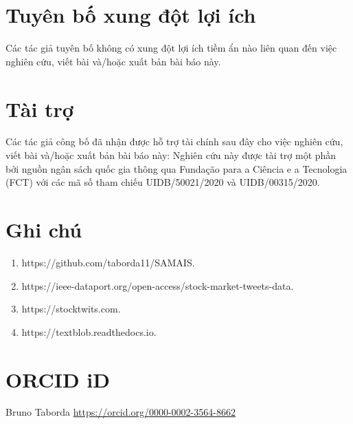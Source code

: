 \section*{Tuyên bố xung đột lợi ích}

Các tác giả tuyên bố không có xung đột lợi ích tiềm ẩn nào liên quan đến việc nghiên cứu, viết bài và/hoặc xuất bản bài báo này.

\section*{Tài trợ}

Các tác giả công bố đã nhận được hỗ trợ tài chính sau đây cho việc nghiên cứu, viết bài và/hoặc xuất bản bài báo này: Nghiên cứu này được tài trợ một phần bởi nguồn ngân sách quốc gia thông qua Fundação para a Ciência e a Tecnologia (FCT) với các mã số tham chiếu UIDB/50021/2020 và UIDB/00315/2020.

\section*{Ghi chú}

\begin{enumerate}
  \item https://github.com/taborda11/SAMAIS.
  \item https://ieee-dataport.org/open-access/stock-market-tweets-data.
  \item https://stocktwits.com.
  \item https://textblob.readthedocs.io.
\end{enumerate}

\section*{ORCID iD}

Bruno Taborda \url{https://orcid.org/0000-0002-3564-8662}

